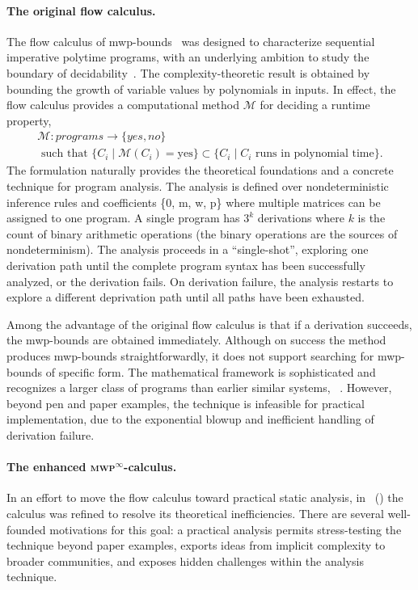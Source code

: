 \paragraph*{The original flow calculus.}
The flow calculus of mwp-bounds~\cite{jones2009} was designed to characterize sequential imperative polytime programs,
with an underlying ambition to study the boundary of decidability~\cite{kristiansen2017}.
The complexity-theoretic result is obtained by bounding the growth of variable values by polynomials in inputs.
In effect, the flow calculus provides a computational method \(\mathcal{M}\) for deciding a runtime property,
\begin{gather*}
\mathcal{M}: programs \rightarrow \{yes, no \} \\
\text{ such that } \{C_i \mid \mathcal{M}(C_i) = \text{yes} \} \subset \{ C_i \mid C_i \text{ runs in polynomial time} \}.
\end{gather*}
The formulation naturally provides the theoretical foundations and a concrete technique for program analysis.
The analysis is defined over nondeterministic inference rules and coefficients \{0, m, w, p\} where multiple matrices can be assigned to one program.
A single program has \(3^k\) derivations where \(k\) is the count of binary arithmetic operations (the binary operations are the sources of nondeterminism).
The analysis proceeds in a \enquote{single-shot}, exploring one derivation path until the complete program syntax has been successfully analyzed, or the derivation fails.
On derivation failure, the analysis restarts to explore a different deprivation path until all paths have been exhausted.

Among the advantage of the original flow calculus
is that if a derivation succeeds, the mwp-bounds are obtained immediately.
Although on success the method produces mwp-bounds straightforwardly, it does not support searching for mwp-bounds of specific form.
The mathematical framework is sophisticated and recognizes a larger class of programs than earlier similar systems, \eg~\cite{niggl2006}.
However, beyond pen and paper examples, the technique is infeasible for practical implementation, due to the exponential blowup and inefficient handling of derivation failure.

\paragraph*{The enhanced \textsc{mwp}\(^\infty\)-calculus.}
In an effort to move the flow calculus toward practical static analysis,
in~\cite{aubert20222} () the calculus was refined to resolve its theoretical inefficiencies.
There are several well-founded motivations for this goal:
a practical analysis permits stress-testing the technique beyond paper examples, exports ideas from implicit complexity to broader communities, and exposes hidden challenges within the analysis technique.

